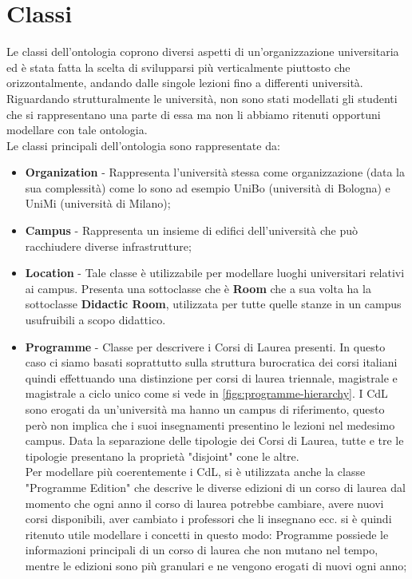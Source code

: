 \section{Classi}

Le classi dell'ontologia coprono diversi aspetti di un'organizzazione universitaria ed è stata fatta la scelta di svilupparsi più verticalmente piuttosto che orizzontalmente, andando dalle singole lezioni fino a differenti università. Riguardando strutturalmente le università, non sono stati modellati gli studenti che si rappresentano una parte di essa ma non li abbiamo ritenuti opportuni modellare con tale ontologia.
\\
Le classi principali dell'ontologia sono rappresentate da:
\begin{itemize}
    \item \textbf{Organization} - Rappresenta l'università stessa come organizzazione (data la sua complessità) come lo sono ad esempio UniBo (università di Bologna) e UniMi (università di Milano);
    
    \item \textbf{Campus} - Rappresenta un insieme di edifici dell'università che può racchiudere diverse infrastrutture;

    \item \textbf{Location} - Tale classe è utilizzabile per modellare luoghi universitari relativi ai campus. Presenta una sottoclasse che è \textbf{Room} che a sua volta ha la sottoclasse \textbf{Didactic Room}, utilizzata per tutte quelle stanze in un campus usufruibili a scopo didattico.
    
    \item \textbf{Programme} - Classe per descrivere i Corsi di Laurea presenti. In questo caso ci siamo basati soprattutto sulla struttura burocratica dei corsi italiani quindi effettuando una distinzione per corsi di laurea triennale, magistrale e magistrale a ciclo unico come si vede in \cref{figs:programme-hierarchy}. I CdL sono erogati da un'università ma hanno un campus di riferimento, questo però non implica che i suoi insegnamenti presentino le lezioni nel medesimo campus. Data la separazione delle tipologie dei Corsi di Laurea, tutte e tre le tipologie presentano la proprietà "disjoint" cone le altre.
    \\
    Per modellare più coerentemente i CdL, si è utilizzata anche la classe "Programme Edition" che descrive le diverse edizioni di un corso di laurea dal momento che ogni anno il corso di laurea potrebbe cambiare, avere nuovi corsi disponibili, aver cambiato i professori che li insegnano ecc. si è quindi ritenuto utile modellare i concetti in questo modo: Programme possiede le informazioni principali di un corso di laurea che non mutano nel tempo, mentre le edizioni sono più granulari e ne vengono erogati di nuovi ogni anno;
    

\end{itemize}
